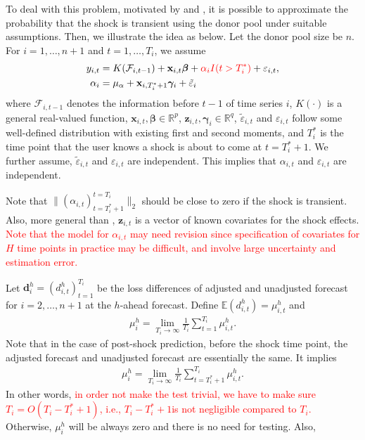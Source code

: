 \documentclass[12pt]{article}
\def\mbf#1{\mathbf{#1}} %
\newcommand{\reals}{\mathbb{R}} %
\def\mc#1{\mathcal{#1}} %
\def\E{\mathbb{E}} %
\def\mc#1{\mathcal{#1}}
\def\bs#1{\boldsymbol{#1}}
\theoremstyle{definition}
\theoremstyle{definition}
\begin{document}
To deal with this problem, motivated by \cite{abadie2010synthetic} and \cite{lin2020minimizing}, it is possible to approximate the probability that the shock is transient using the donor pool  under suitable assumptions. Then, we illustrate the idea as below. Let the donor pool size be $n$. For $i = 1, \ldots, n +1$ and $t = 1, \ldots, T_i$, we assume
\begin{align*}
  y_{i,t} &= K(\mc{F}_{i, t-1}) + \mathbf{x}_{i,t}\boldsymbol{\beta}  +  \textcolor{red}{\alpha_{i} I(t > T_i^*)}+\varepsilon_{i,t},\\
         \alpha_{i} &= \mu_{\alpha} + \mbf{x}_{i,T_i^*+1}\bs{\gamma}_{i} + \tilde{\varepsilon}_{i}
\end{align*}
where $\mc{F}_{i, t-1}$  denotes the information  before $t-1$ of time series $i$, $K(\cdot)$ is a general real-valued function, $\mathbf{x}_{i,t},\bs{\beta}\in \reals^{p}$, $\bs{z}_{i,t}, \bs{\gamma}_{i}\in \reals^q$, $\tilde{\varepsilon}_{i,t}$ and $\varepsilon_{i,t}$ follow some well-defined distribution with existing first and second moments, and $T_i^*$ is the time point that the user knows a shock is about to come at $t = T_{i}^*+1$. We further assume, $\tilde{\varepsilon}_{i,t}$ and $\varepsilon_{i,t}$ are  independent. This implies that $\alpha_{i,t}$ and $\varepsilon_{i,t}$ are independent.

Note that $\|{(\alpha_{i,t})_{t=T_i^*+1}^{t=T_i}}\|_2$ should be close to zero if the shock is transient. Also, more general than \cite{lin2020minimizing}, $\mbf{z}_{i,t}$ is a vector of known covariates for the shock effects. \textcolor{red}{Note that the model for $\alpha_{i,t}$ may need revision since specification of covariates for $H$ time points in practice may be difficult, and involve large uncertainty and estimation error.}

Let $\bs{d}_i^h=(d_{i,t}^h)_{t=1}^{T_i}$ be the loss differences of adjusted and unadjusted forecast for $i = 2, \ldots, n+1$ at the $h$-ahead forecast. Define $\E(d_{i,t}^h)=\mu_{i,t}^h$ and
\begin{align*}
  \mu_{i}^h = \lim_{T_i \to \infty} \frac{1}{T_i} \sum_{t=1}^{T_i} \mu_{i,t}^h.
\end{align*}
Note that in the case of post-shock prediction, before the shock time point, the adjusted forecast and unadjusted forecast are essentially the same. It implies
\begin{align*}
  \mu_{i}^h = \lim_{T_i \to \infty} \frac{1}{T_i} \sum_{t=T_i^*+1}^{T_i} \mu_{i,t}^h.
\end{align*}
In other words, \textcolor{red}{in order not make the test trivial, we have to make sure $T_i=O(T_i-T_i^*+1)$, i.e., $T_i-T_i^*+1$is not negligible compared to $T_i$.} Otherwise, $\mu_i^h$ will be always zero and there is no need for testing. Also, 
\end{document}

